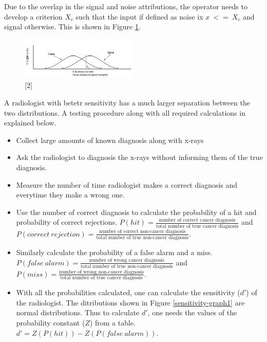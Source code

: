 \documentclass[12pt]{article}
\begin{document}
	Due to the overlap in the signal and noise attributions, the operator needs to develop a criterion $X_c$ such that the input if defined as noise ix $x\ <=\ X_c$ and signal otherwise. This is shown in Figure \ref{graph2}.
	
	\begin{figure}[!ht]
		\centering
		\includegraphics[width=0.5\textwidth]{graph2}
		\caption{[2]}
		\label{graph2}
	\end{figure}
	
	A radiologist with betetr sensitivity has a much larger separation between the two distributions. A testing procedure along with all required calculations in explained below.
	
	\begin{itemize}
		\item Collect large amounts of known diagnosis along with x-rays
		\item Ask the radiologist to diagnosis the x-rays without informing them of the true diagnosis.
		\item Measure the number of time radiologist makes a correct diagnosis and everytime they make a wrong one.
		\item Use the number of correct diagnosis to calculate the probability of a hit and probability of correct rejections. $P(hit)=\frac{\text{number of correct cancer diagnosis}}{\text{total number of true cancer diagnosis}}$ and $P(correct\ rejection)=\frac{\text{number of correct non-cancer diagnosis}}{\text{total number of true non-cancer diagnosis}}$.
		\item Similarly calculate the probability of a false alarm and a miss. $P(false\ alarm)=\frac{\text{number of wrong cancer diagnosis}}{\text{total number of true non-cancer diagnosis}}$ and $P(miss)=\frac{\text{number of wrong non-cancer diagnosis}}{\text{total number of true cancer diagnosis}}$.
		\item With all the probabilities calculated, one can calculate the sensitivity ($d'$) of the radiologist. The ditributions shown in Figure \ref{sensitivity-graph1} are normal distributions. Thus to calculate $d'$, one needs the values of the probability constant ($Z$) from a table. $d'=Z(P(hit))-Z(P(false\ alarm))$.
	\end{itemize}	 
	
\end{document}
